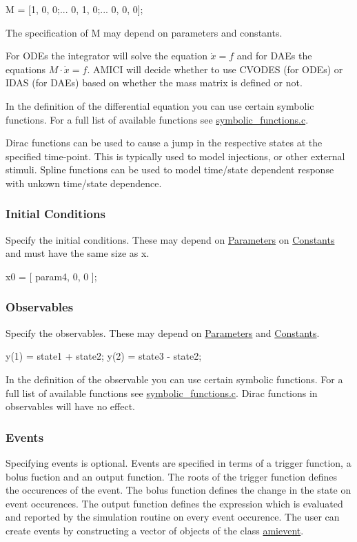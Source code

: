 \begin{DoxyCode}
M = [1, 0, 0;...
0, 1, 0;...
0, 0, 0];
\end{DoxyCode}


The specification of M may depend on parameters and constants.

For O\+D\+Es the integrator will solve the equation $ \dot{x} = f $ and for D\+A\+Es the equations $ M \cdot \dot{x} = f $. A\+M\+I\+C\+I will decide whether to use C\+V\+O\+D\+E\+S (for O\+D\+Es) or I\+D\+A\+S (for D\+A\+Es) based on whether the mass matrix is defined or not.

In the definition of the differential equation you can use certain symbolic functions. For a full list of available functions see \hyperlink{symbolic__functions_8c}{symbolic\+\_\+functions.\+c}.

Dirac functions can be used to cause a jump in the respective states at the specified time-\/point. This is typically used to model injections, or other external stimuli. Spline functions can be used to model time/state dependent response with unkown time/state dependence.\hypertarget{def_simu_init}{}\subsubsection{Initial Conditions}\label{def_simu_init}
Specify the initial conditions. These may depend on \hyperlink{def_simu_parameters}{Parameters} on \hyperlink{def_simu_constants}{Constants} and must have the same size as x.


\begin{DoxyCode}
x0 = [ param4, 0, 0 ]; 
\end{DoxyCode}
\hypertarget{def_simu_observables}{}\subsubsection{Observables}\label{def_simu_observables}
Specify the observables. These may depend on \hyperlink{def_simu_parameters}{Parameters} and \hyperlink{def_simu_constants}{Constants}.


\begin{DoxyCode}
y(1) = state1 + state2;
y(2) = state3 - state2;
\end{DoxyCode}


In the definition of the observable you can use certain symbolic functions. For a full list of available functions see \hyperlink{symbolic__functions_8c}{symbolic\+\_\+functions.\+c}. Dirac functions in observables will have no effect.\hypertarget{def_simu_events}{}\subsubsection{Events}\label{def_simu_events}
Specifying events is optional. Events are specified in terms of a trigger function, a bolus fuction and an output function. The roots of the trigger function defines the occurences of the event. The bolus function defines the change in the state on event occurences. The output function defines the expression which is evaluated and reported by the simulation routine on every event occurence. The user can create events by constructing a vector of objects of the class \hyperlink{classamievent}{amievent}.


